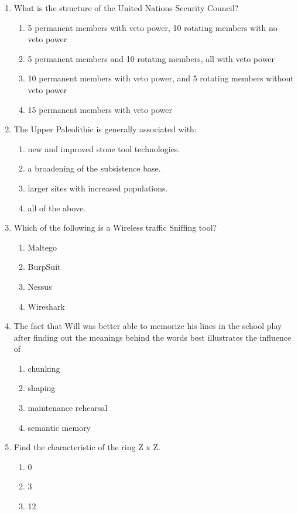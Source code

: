 \documentclass[12pt]{article}
\begin{document}
\begin{enumerate}[label=\arabic*.]
\item What is the structure of the United Nations Security Council?
\begin{enumerate}[label=(\alph*)]
    \item 5 permanent members with veto power, 10 rotating members with no veto power
    \item 5 permanent members and 10 rotating members, all with veto power
    \item 10 permanent members with veto power, and 5 rotating members without veto power
    \item 15 permanent members with veto power
\end{enumerate}
\item The Upper Paleolithic is generally associated with:
\begin{enumerate}[label=(\alph*)]
    \item new and improved stone tool technologies.
    \item a broadening of the subsistence base.
    \item larger sites with increased populations.
    \item all of the above.
\end{enumerate}
\item Which of the following is a Wireless traffic Sniffing tool?
\begin{enumerate}[label=(\alph*)]
    \item Maltego
    \item BurpSuit
    \item Nessus
    \item Wireshark
\end{enumerate}
\item The fact that Will was better able to memorize his lines in the school play after finding out the meanings behind the words best illustrates the influence of
\begin{enumerate}[label=(\alph*)]
    \item chunking
    \item shaping
    \item maintenance rehearsal
    \item semantic memory
\end{enumerate}
\item Find the characteristic of the ring Z x Z.
\begin{enumerate}[label=(\alph*)]
    \item 0
    \item 3
    \item 12

\end{enumerate}
\end{enumerate}
\end{document}
